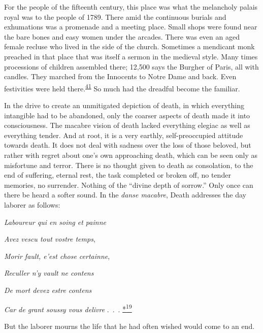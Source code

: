 For the people of the fifteenth century, this place was what the
melancholy palais royal was to the people of 1789. There amid the
continuous burials and exhumations was a promenade and a meeting place.
Small shops were found near the bare bones and easy women under the
arcades. There was even an aged female recluse who lived in the side of
the church. Sometimes a mendicant monk preached in that place that was
itself a sermon in the medieval style. Many times processions of
children assembled there; 12,500 says the Burgher of Paris, all with
candles. They marched from the Innocents to Notre Dame and back. Even
festivities were held
there.\textsuperscript{\protect\hypertarget{12_Chapter_Five__THE_VISION_OF_DEAT.xhtmlux5cux23id_1273}{\protect\hyperlink{23_NOTES.xhtmlux5cux23page_416}{41}}}
So much had the dreadful become the familiar.

In the drive to create an unmitigated depiction of death, in which
everything intangible had to be abandoned, only the coarser aspects of
death made it into consciousness. The macabre vision of death lacked
everything elegiac as well as everything tender. And at root, it is a
very earthly, self-preoccupied attitude towards death. It does
\protect\hypertarget{12_Chapter_Five__THE_VISION_OF_DEAT.xhtmlux5cux23page_171}{}{}not
deal with sadness over the loss of those beloved, but rather with regret
about one's own approaching death, which can be seen only as misfortune
and terror. There is no thought given to death as consolation, to the
end of suffering, eternal rest, the task completed or broken off, no
tender memories, no surrender. Nothing of the ``divine depth of
sorrow.'' Only once can there be heard a softer sound. In the
\emph{danse macabre}, Death addresses the day laborer as follows:

\emph{Laboureur qui en soing et painne}

\emph{Avez vescu tout vostre temps},

\emph{Morir fault, e'est chose certainne},

\emph{Reculler n'y vault ne contens}

\emph{De mort devez estre contens}

\emph{Car de grant soussy vous delivre} .~.~.
\protect\hypertarget{12_Chapter_Five__THE_VISION_OF_DEAT.xhtmlux5cux23id_2987}{\protect\hyperlink{23_NOTES.xhtmlux5cux23id_2988}{*\textsuperscript{19}}}

But the laborer mourns the life that he had often wished would come to
an end.

